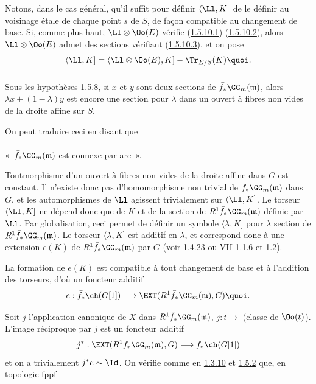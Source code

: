 Notons, dans le cas général, qu'il suffit pour définir
$\langle \Ll,K]$ de le définir au voisinage étale de chaque point $s$
de $S$, de façon compatible au changement de base. Si, comme plus
haut, $\Ll\otimes \Oo(E)$ vérifie (\hyperref[XVIII.par1.5.10.1]{1.5.10.1})
(\hyperref[XVIII.par1.5.10.2]{1.5.10.2}), 
alors $\Ll\otimes \Oo(E)$ admet des sections vérifiant
(\hyperref[XVIII.par1.5.10.3]{1.5.10.3}), et on pose
$$
\langle \Ll,K]=\langle \Ll\otimes \Oo(E), K]-\Tr_{E/S}(K){\quoi}.
$$

\subsubsection{}
Sous les hypothèses \hyperref[XVIII.subsubsec1.5.8]{1.5.8}, si $x$ et $y$ sont
deux sections de 
$\bar{f}_{\ast}\GG_{m}(\mathfrak{m})$, alors $\lambda x+(1-\lambda)y$ est
encore une section pour $\lambda$ dans un ouvert à fibres non vides de
la droite affine sur $S$.

On peut traduire ceci en disant que 

\paragraph{}
« $\bar{f}_{\ast}\GG_{m}(\mathfrak{m})$ est connexe par arc ».

Tout\pageoriginale morphisme d'un ouvert à fibres non vides de la
droite affine dans $G$ est constant. Il n'existe donc pas
d'homomorphisme non trivial de $\bar{f}_{\ast}\GG_{m}(\mathfrak{m})$ dans
$G$, et les automorphismes de $\Ll$ agissent trivialement sur
$\langle \Ll,K]$. Le torseur $\langle \Ll,K]$ ne dépend donc que de
$K$ et de la section de $R^{1}\bar{f}_{\ast}\GG_{m}(\mathfrak{m})$ définie
par $\Ll$. Par globalisation, ceci permet de définir un
symbole $\langle \lambda,K]$ pour $\lambda$ section de
$R^{1}\bar{f}_{\ast}\GG_{m}(\mathfrak{m})$. Le torseur $\langle \lambda,K]$ est
additif en $\lambda$, et correspond donc à une extension $e(K)$ de
$R^{1}\bar{f}_{\ast}\GG_{m}(\mathfrak{m})$ par $G$ (voir \hyperref[XVIII.prop1.4.23]{1.4.23}
ou  VII 1.1.6 et 1.2).

La formation de $e(K)$ est compatible à tout changement de base et à
l'addition des torseurs, d'où un foncteur additif
$$
e:\bar{f}_{\ast}\ch(G[1])\longrightarrow
\EXT(R^{1}\bar{f}_{\ast}\GG_{m}(\mathfrak{m}),G){\quoi}.
$$

Soit $j$ l'application canonique de $X$ dans
$R^{1}\bar{f}_{\ast}\GG_{m}(\mathfrak{m})$, $j:t\rightarrow$ (classe de
$\Oo(t)$). L'image réciproque par $j$ est un foncteur additif
$$
j^{\ast}:\EXT(R^{1}\bar{f}_{\ast}\GG_{m}(\mathfrak{m}),G)\longrightarrow
\bar{f}_{\ast}\ch(G[1])
$$
et on a trivialement $j^{\ast}e\sim \Id$. On vérifie comme en
\hyperref[XVIII.thm1.3.10]{1.3.10} et \hyperref[XVIII.thm1.5.2]{1.5.2} que, en topologie fppf

